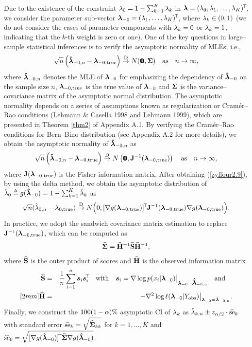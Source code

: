 Due to the existence of the constraint $\lambda_0 = 1 - \sum_{k=1}^K \lambda_k$ in ${\boldsymbol{\lambda}} = (\lambda_0, \lambda_1, \dots, \lambda_K)^{\!\top\!}$, we consider the parameter sub-vector ${\boldsymbol{\lambda}}_{-0} = (\lambda_1, \dots, \lambda_K)^{\!\top\!}$, where $\lambda_k \in (0, 1)$ (we do not consider the cases of parameter components with $\lambda_k = 0$ or $\lambda_k=1$, indicating that the $k$-th weight is zero or one). One of the key questions in large--sample statistical inferences is to verify the asymptotic normality of MLEs; i.e.,
\begin{eqnarray*}
   \sqrt{n} \left(\mbox{\boldmath${\hat \lambda}$}_{-0, n} - {\boldsymbol{\lambda}}_{-0, \rm true} \right) \stackrel{\rm D}{\to} N({\bf 0}\!\!\!{\bf 0}, {\mbox{\boldmath$\Sigma$}}) \quad \mbox{as} \quad n \to \infty,
\end{eqnarray*}
where $\mbox{\boldmath${\hat \lambda}$}_{-0, n}$ denotes the MLE of ${\boldsymbol{\lambda}}_{-0}$ for emphasizing the dependency of $\mbox{\boldmath${\hat \lambda}$}_{-0}$ on the sample size $n$,  ${\boldsymbol{\lambda}}_{-0, \rm true}$ is the true value of ${\boldsymbol{\lambda}}_{-0}$ and ${\mbox{\boldmath$\Sigma$}}$ is the variance--covariance matrix of the asymptotic normal  distribution. The asymptotic normality depends on a series of assumptions known as regularization or Cram\'er--Rao conditions (Lehmann \& Casella 1998 and Lehmann 1999), which are presented in Theorem \ref{thm2} of Appendix A.1. By verifying the Cram\'er--Rao conditions for Bern--Bino distribution (see Appendix A.2 for more details), we obtain the asymptotic normality of $\mbox{\boldmath${\hat \lambda}$}_{-0, n}$ as
\begin{eqnarray} \label{zyffour2.9}
   \sqrt{n}\left(\mbox{\boldmath${\hat \lambda}$}_{-0, n} - {\boldsymbol{\lambda}}_{-0, \rm true}\right) \stackrel{\rm D}{\to}
   N \left({\bf 0}\!\!\!{\bf 0}, {\bf J}^{-1}({\boldsymbol{\lambda}}_{-0,\rm true}) \right) \quad \mbox{as} \quad n \to \infty,
\end{eqnarray}
where ${\bf J}({\boldsymbol{\lambda}}_{-0,\rm true})$ is the Fisher information matrix. After obtaining (\ref{zyffour2.9}), by using the delta method, we obtain the asymptotic distribution of $\hat{\lambda}_0 \triangleq g(\mbox{\boldmath${\hat \lambda}$}_{-0}) = 1 - \sum_{k=1}^K \hat{\lambda}_k$ as
$$
   \sqrt{n} (\hat{\lambda}_{0, n} - \lambda_{0,\rm true}) \stackrel{\rm D}{\to}
   N \Big(0, [\nabla g({\boldsymbol{\lambda}}_{-0, \rm true})]^{\!\top\!} {\bf J}^{-1}({\boldsymbol{\lambda}}_{-0, \rm true}) \nabla g({\boldsymbol{\lambda}}_{-0, \rm true}) \Big).
$$
In practice, we adopt the sandwich covariance matrix estimation to replace ${\bf J}^{-1}({\boldsymbol{\lambda}}_{-0, \rm true})$, which can be computed as
$$
   \widehat{{\mbox{\boldmath$\Sigma$}}} = \widehat{{\bf H}}^{-1} \widehat{{\bf S}} \widehat{{\bf H}}^{-1},
$$
where $\widehat{{\bf S}}$ is the outer product of scores and $\widehat{{\bf H}}$ is the observed information matrix
\begin{eqnarray*}
   \widehat{{\bf S}} &=& \frac{1}{n} \sum_{i=1}^n {\boldsymbol{s}}_i{\boldsymbol{s}}_i^{\!\top\!} \quad \mbox{with} \quad {\boldsymbol{s}}_i = \nabla \log p(x_i|{\boldsymbol{\lambda}}_{-0}) \big|_{{\boldsymbol{\lambda}}_{-0} = \mbox{\boldmath${\hat \lambda}$}_{-0,n}} \quad \mbox{and} \quad \\ [2mm]
   \widehat{{\bf H}} &=& -\nabla^2 \log \ell({\boldsymbol{\lambda}}_{-0}|Y_{\rm obs})\big|_{{\boldsymbol{\lambda}}_{-0} = \hat{{\boldsymbol{\lambda}}}_{-0,n}}.
\end{eqnarray*}
Finally, we construct the $100(1-\alpha)\%$ asymptotic CI of $\lambda_k$ as $\hat{\lambda}_{k,n} \pm z_{\alpha/2} \cdot \widehat{\mbox{se}}_k$ with standard error $\widehat{\mbox{se}}_k = \sqrt{\widehat{{\mbox{\boldmath$\Sigma$}}}_{kk}}$ for $k = 1, \ldots, K$ and $\widehat{\mbox{se}}_0 = \sqrt{ [\nabla g(\mbox{\boldmath${\hat \lambda}$}_{-0})]^{\!\top\!} \widehat{{\mbox{\boldmath$\Sigma$}}} \nabla g(\mbox{\boldmath${\hat \lambda}$}_{-0}) }$.


